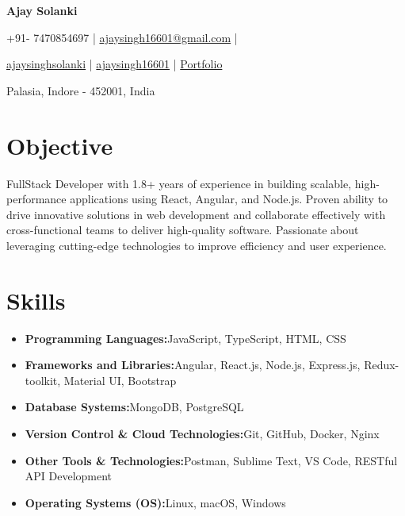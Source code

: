 \documentclass[a4paper,11pt]{article}
\newcommand{\resumeItem}[2]{
  \item{
    \textbf{#1}{\hspace{0.5mm}#2 \vspace{-0.5mm}}
  }
}
\newcommand{\resumeSubItem}[2]{\resumeItem{#1}{#2}\vspace{-4pt}}
\newcommand{\resumeHeadingSkillStart}{\begin{itemize}[leftmargin=*,itemsep=1.7mm, rightmargin=2ex]}
\newcommand{\resumeHeadingSkillEnd}{\end{itemize}\vspace{-2mm}}
\newcommand{\socialicon}[1]{\raisebox{-0.05em}{\resizebox{!}{1em}{#1}}}
\newcommand{\headerfontiii}{\fontfamily{ppl}\selectfont} %
\begin{document}
\headerfontiii

\begin{center}
    {\Huge\textbf{Ajay Solanki}}
\end{center}
\vspace{-5mm}

\begin{center}
    \small{
    +91-
    7470854697 | \href{mailto:ajaysingh16601@gmail.com}{ajaysingh16601@gmail.com} |
    }
\end{center}
\vspace{-5.5mm}

\begin{center}
    \small{
    \socialicon{\faLinkedin} \href{https://www.linkedin.com/in/ajaysinghsolanki/}{ajaysinghsolanki} | 
    \socialicon{\faGithub} \href{https://github.com/ajaysingh16601}{ajaysingh16601} | 
    \socialicon{\faIcon{globe}} \href{https://portfolio-threejs-ashy.vercel.app/}{Portfolio} 
    }
\end{center}
\vspace{-5.5mm}
\begin{center}
    \small{Palasia, Indore - 452001, India}
\end{center}

\vspace{-4mm}

\section{\textbf{Objective}}
\vspace{1mm}
\small{
  FullStack Developer with 1.8+ years of experience in building scalable, high-performance applications using React, Angular, and Node.js. Proven ability to drive innovative solutions in web development and collaborate effectively with cross-functional teams to deliver high-quality software. Passionate about leveraging cutting-edge technologies to improve efficiency and user experience. 
}
\vspace{-2mm}


\section{\textbf{Skills}}
\vspace{-0.2mm}
\resumeHeadingSkillStart
    \resumeSubItem{Programming Languages:}
        {JavaScript, TypeScript, HTML, CSS}
    \resumeSubItem{Frameworks and Libraries:}
        {Angular, React.js, Node.js, Express.js, Redux-toolkit, Material UI, Bootstrap}
    \resumeSubItem{Database Systems:}
        {MongoDB, PostgreSQL}
    \resumeSubItem{Version Control \& Cloud Technologies:}
        {Git, GitHub, Docker, Nginx}
    \resumeSubItem{Other Tools \& Technologies:}
        {Postman, Sublime Text, VS Code, RESTful API Development}
    \resumeSubItem{Operating Systems (OS):}
        {Linux, macOS, Windows}
\resumeHeadingSkillEnd
\end{document}
